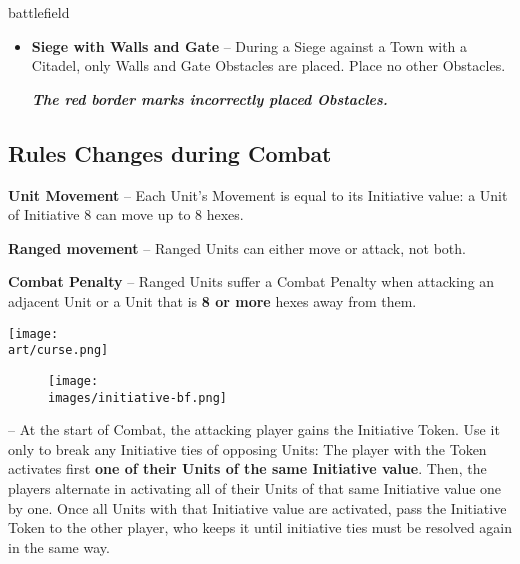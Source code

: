 \newpage
\begin{expansion}{battlefield}
  \begin{multicols*}{2}
  \begin{itemize}
    \item \textbf{Siege with Walls and Gate} – During a Siege against a Town with a Citadel, only Walls and Gate Obstacles are placed.
      Place no other Obstacles.

    {\footnotesize\textbf{\textit{\textcolor{darkcandyapplered}{The red border marks incorrectly placed Obstacles.}}}}
  \end{itemize}
  \subsection*{Rules Changes during Combat}
  \begin{itemize}
    \item \textbf{Unit Movement} – Each Unit's Movement is equal to its Initiative value: a Unit of Initiative 8 can move up to 8 hexes.
    \item \textbf{Ranged movement}  – Ranged  Units can either move or attack, not both.
    \item \textbf{Combat Penalty} – Ranged  Units suffer a Combat Penalty when attacking an adjacent Unit or a Unit that is \textbf{8 or more} hexes away from them.
    \begin{center}
      \vspace*{1em}
      \texttt{[image: \\art/curse.png]}
    \end{center}
    \columnbreak

    \begin{minipage}{\linewidth}
      \setlength\intextsep{0pt}
      \setlength\columnsep{1em}
      \begin{wrapfigure}{r}{0.3\linewidth}
        \texttt{[image: \\images/initiative-bf.png]}
      \end{wrapfigure}
      \item \textbf{} – At the start of Combat, the attacking player gains the Initiative Token.
      Use it only to break any Initiative ties of opposing Units:
      The player with the Token activates first \textbf{one of their Units of the same Initiative value}.
      Then, the players alternate in activating all of their Units of that same Initiative value one by one.
      Once all Units with that Initiative value are activated, pass the Initiative Token to the other player, who keeps it until initiative ties must be resolved again in the same way.
    \end{minipage}


\end{itemize}
\end{multicols*}
\end{expansion}
